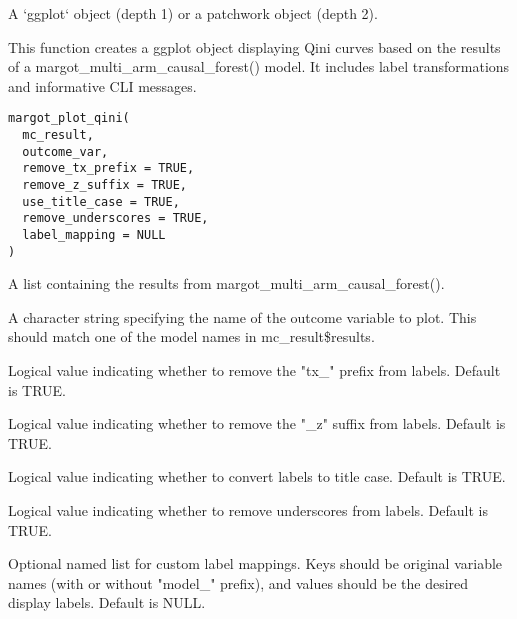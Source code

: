 \documentclass[a4paper]{book}
\begin{document}
%
\begin{Value}
A `ggplot` object (depth 1) or a patchwork object (depth 2).
\end{Value}
%
\begin{Description}
This function creates a ggplot object displaying Qini curves based on the
results of a margot\_multi\_arm\_causal\_forest() model. It includes label
transformations and informative CLI messages.
\end{Description}
%
\begin{Usage}
\begin{verbatim}
margot_plot_qini(
  mc_result,
  outcome_var,
  remove_tx_prefix = TRUE,
  remove_z_suffix = TRUE,
  use_title_case = TRUE,
  remove_underscores = TRUE,
  label_mapping = NULL
)
\end{verbatim}
\end{Usage}
%
\begin{Arguments}
\begin{ldescription}
\item[\code{mc\_result}] A list containing the results from margot\_multi\_arm\_causal\_forest().

\item[\code{outcome\_var}] A character string specifying the name of the outcome variable
to plot. This should match one of the model names in mc\_result\$results.

\item[\code{remove\_tx\_prefix}] Logical value indicating whether to remove the "tx\_" prefix from labels. Default is TRUE.

\item[\code{remove\_z\_suffix}] Logical value indicating whether to remove the "\_z" suffix from labels. Default is TRUE.

\item[\code{use\_title\_case}] Logical value indicating whether to convert labels to title case. Default is TRUE.

\item[\code{remove\_underscores}] Logical value indicating whether to remove underscores from labels. Default is TRUE.

\item[\code{label\_mapping}] Optional named list for custom label mappings. Keys should be original variable names
(with or without "model\_" prefix), and values should be the desired display labels. Default is NULL.
\end{ldescription}
\end{Arguments}
\end{document}
